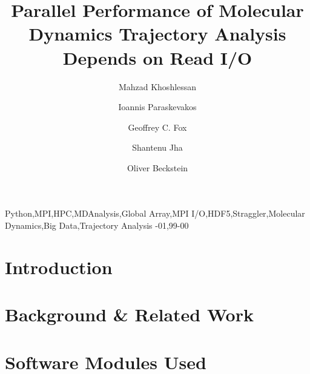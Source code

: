 \documentclass[review]{elsarticle}
\begin{document}
\begin{frontmatter}    

\title{Parallel Performance of Molecular Dynamics Trajectory Analysis Depends on Read I/O}

\author[ASUphysics]{Mahzad Khoshlessan}

\author[Rutgers]{Ioannis Paraskevakos}

\author[IndianaDSC]{Geoffrey C. Fox}

\author[Rutgers]{Shantenu Jha}

\author[ASUphysics,ASUCBP]{Oliver Beckstein}

\address[ASUphysics]{Department of Physics, Arizona State University,
  Tempe, AZ 85281, USA}
\address[ASUCBP]{Center for Biological Physics, Arizona State University,
  Tempe, AZ 85281, USA}
\address[Rutgers]{Department of Electrical \& Computer Engineering,
  Rutgers University, Piscataway, NJ 08854, USA}
\address[IndianaDSC]{Digital Science Center, Indiana University,
  Bloomington, IN 47405}

    


\begin{keyword}
Python\sep MPI\sep HPC\sep MDAnalysis\sep Global Array\sep MPI I/O\sep HDF5\sep Straggler\sep Molecular Dynamics\sep Big Data\sep Trajectory Analysis
-01\sep  99-00
\end{keyword}

\end{frontmatter}

\linenumbers

\section{Introduction}


\section{Background \& Related Work}


\section{Software Modules Used}

\end{document}
